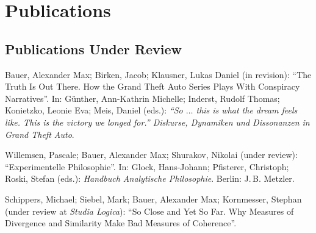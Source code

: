 \documentclass[a4paper,10pt]{article}
\newenvironment{literature}{%
   \parskip6pt\parindent0pt\raggedright
   \def\lititem{\hangindent=1cm\hangafter1}}{%
   \par\ignorespaces}
\begin{document}
\clearpage
\section{Publications}


\subsection*{Publications Under Review}
\begin{literature}
\lititem Bauer, Alexander Max; Birken, Jacob; Klausner,  Lukas Daniel (in revision): \enquote{The Truth Is Out There. How the Grand Theft Auto Series Plays With Conspiracy Narratives}. In: Günther, Ann-Kathrin Michelle; Inderst, Rudolf Thomas; Konietzko, Leonie Eva;  Meis, Daniel (eds.): \textit{\enquote{So $\ldots$ this is what the dream feels like. This is the victory we longed for.} Diskurse, Dynamiken und Dissonanzen in Grand Theft Auto}.

\lititem Willemsen, Pascale; Bauer, Alexander Max; Shurakov, Nikolai (under review): \enquote{Experimentelle Philosophie}. In: Glock, Hans-Johann; Pfisterer, Christoph; Roski, Stefan (eds.): \textit{Handbuch Analytische Philosophie}. Berlin: J.\,B. Metzler.

\lititem Schippers, Michael; Siebel, Mark; Bauer, Alexander Max; Kornmesser, Stephan (under review at \textit{Studia Logica}): \enquote{So Close and Yet So Far. Why Measures of Divergence and Similarity Make Bad Measures of Coherence}.
\end{literature}


\end{document}
